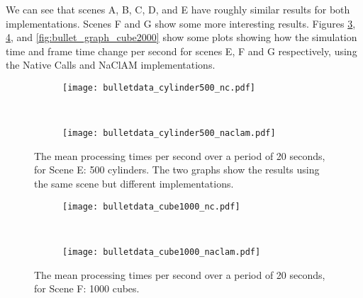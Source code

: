 We can see that scenes A, B, C, D, and E have roughly similar results for both implementations. Scenes F and G show some more interesting results. Figures \ref{fig:bullet_graph_cyl500}, \ref{fig:bullet_graph_cube1000}, and \ref{fig:bullet_graph_cube2000} show some plots showing how the simulation time and frame time change per second for scenes E, F and G respectively, using the Native Calls and NaClAM implementations.

\begin{figure}
        \centering
        \begin{subfigure}[b]{\textwidth}
                \texttt{[image: bulletdata\_cylinder500\_nc.pdf]}
                \label{fig:bulletdata_cylinder500_nc}
        \end{subfigure}%
        \\
        \begin{subfigure}[b]{\textwidth}
                \texttt{[image: bulletdata\_cylinder500\_naclam.pdf]}
                \label{fig:bulletdata_cylinder500_naclam}
        \end{subfigure}
        \caption{The mean processing times per second over a period of 20 seconds, for Scene E: 500 cylinders. The two graphs show the results using the same scene but different implementations.}
        \label{fig:bullet_graph_cyl500}
\end{figure}

\begin{figure}
        \centering
        \begin{subfigure}[b]{\textwidth}
                \texttt{[image: bulletdata\_cube1000\_nc.pdf]}
        \end{subfigure}
        \\
        \begin{subfigure}[b]{\textwidth}
                \texttt{[image: bulletdata\_cube1000\_naclam.pdf]}
        \end{subfigure}
        \caption{The mean processing times per second over a period of 20 seconds, for Scene F: 1000 cubes.}
        \label{fig:bullet_graph_cube1000}
\end{figure}

